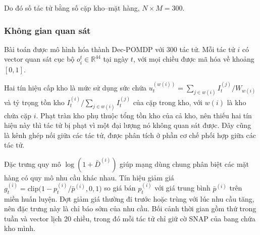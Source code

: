 Do đó số tác tử bằng số cặp kho--mặt hàng, $N \times M = 300$.

\subsubsection{Không gian quan sát}

Bài toán được mô hình hóa thành Dec-POMDP \parencite{oliehoek2016} với 300 tác tử. Mỗi tác tử $i$ có vector quan sát cục bộ $o_i^t \in \mathbb{R}^{44}$ tại ngày $t$, với mọi chiều được mã hóa về khoảng $[0, 1]$.

Hai tín hiệu cấp kho là mức sử dụng sức chứa $u_t^{(w(i))} = \sum_{j \in w(i)} I_t^{(j)} / W_{w(i)}$ và tỷ trọng tồn kho $I_t^{(i)} / \sum_{j \in w(i)} I_t^{(j)}$ của cặp trong kho, với $w(i)$ là kho chứa cặp $i$. Phạt tràn kho phụ thuộc tổng tồn kho của cả kho, nên thiếu hai tín hiệu này thì tác tử bị phạt vì một đại lượng nó không quan sát được. Đây cũng là kênh ghép nối giữa các tác tử, được phân tích ở phần cơ chế phối hợp giữa các tác tử.

Đặc trưng quy mô $\log(1 + \bar{D}^{(i)})$ giúp mạng dùng chung phân biệt các mặt hàng có quy mô nhu cầu khác nhau. Tín hiệu giảm giá $g_t^{(i)} = \mathrm{clip}\bigl(1 - p_t^{(i)} / \bar{p}^{(i)}, 0, 1\bigr)$ so giá bán $p_t^{(i)}$ với giá trung bình $\bar{p}^{(i)}$ trên miền huấn luyện. Đợt giảm giá thường đi trước hoặc trùng với lúc nhu cầu tăng, nên đặc trưng này là chỉ báo sớm của nhu cầu. Bối cảnh thời gian gồm thứ trong tuần và vector lịch 20 chiều, trong đó mỗi tác tử chỉ giữ cờ SNAP của bang chứa kho mình.

